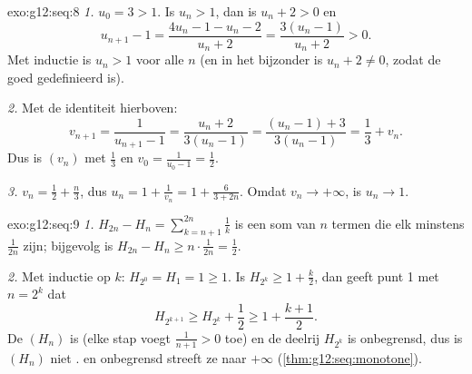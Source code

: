 \begin{solution}{exo:g12:seq:8}
\emph{1.} $u_0 = 3 > 1$. Is $u_n > 1$, dan is $u_n + 2 > 0$ en
\[
u_{n+1} - 1 = \frac{4u_n - 1 - u_n - 2}{u_n + 2} = \frac{3(u_n - 1)}{u_n + 2} > 0 .
\]
Met inductie is $u_n > 1$ voor alle $n$ (en in het bijzonder is
$u_n + 2 \neq 0$, zodat de  goed gedefinieerd is).

\emph{2.} Met de identiteit hierboven:
\[
v_{n+1} = \frac{1}{u_{n+1} - 1} = \frac{u_n + 2}{3(u_n - 1)}
= \frac{(u_n - 1) + 3}{3(u_n - 1)} = \frac{1}{3} + v_n .
\]
Dus is $(v_n)$  met  $\frac13$ en
$v_0 = \frac{1}{u_0 - 1} = \frac12$.

\emph{3.} $v_n = \frac12 + \frac{n}{3}$, dus
$u_n = 1 + \frac{1}{v_n} = 1 + \frac{6}{3 + 2n}$. Omdat $v_n \to +\infty$,
is $u_n \to 1$.
\end{solution}

\begin{solution}{exo:g12:seq:9}
\emph{1.} $H_{2n} - H_n = \sum_{k=n+1}^{2n} \frac{1}{k}$ is een som van $n$
termen die elk minstens $\frac{1}{2n}$ zijn; bijgevolg is
$H_{2n} - H_n \geq n \cdot \frac{1}{2n} = \frac12$.

\emph{2.} Met inductie op $k$: $H_{2^0} = H_1 = 1 \geq 1$. Is
$H_{2^k} \geq 1 + \frac{k}{2}$, dan geeft punt 1 met $n = 2^k$ dat
\[
H_{2^{k+1}} \geq H_{2^k} + \frac12 \geq 1 + \frac{k+1}{2}.
\]
De  $(H_n)$ is  (elke stap voegt $\frac{1}{n+1} > 0$ toe) en de
deelrij $H_{2^k}$ is onbegrensd, dus is $(H_n)$ niet .
 en onbegrensd streeft ze naar $+\infty$
(\cref{thm:g12:seq:monotone}).
\end{solution}

